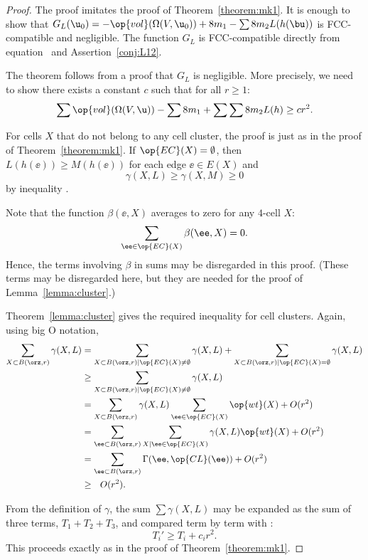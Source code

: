 \begin{proof} The proof imitates the proof of
Theorem~\ref{theorem:mk1}.  It is enough to show that $G_L( \u_0) =
-\op{vol}(\Omega(V, \u_0)) + 8 m_1 - \sum 8 m_2 L(h(\bu))$ is
FCC-compatible and negligible.  The function $G_L$ is FCC-compatible
directly from equation~ and Assertion~\ref{conj:L12}.

The theorem follows from a proof that $G_L$ is negligible.  More
precisely, we need to show there exists a constant $c$ such that
for all $r\ge 1$:%
\begin{equation}\label{eqn:A2neg} 
\sum \op{vol}(\Omega(V, \u)) -\sum 8m_1 + \sum \sum 8 m_2 L(h) \ge c r^2.
\end{equation}

For cells $X$ that do not belong to any cell cluster,
the proof is just as in the proof of Theorem~\ref{theorem:mk1}.
If $\op{EC}(X)=\emptyset$, then 
$L(h(\ee))\ge M(h(\ee))$ for each edge $\ee\in E(X)$ and
\[ \gamma(X,L)\ge \gamma(X,M)\ge 0\]  
by inequality .

Note that the function $\beta(\ee,X)$ averages to zero for any $4$-cell $X$:
\[  
\sum_{\ee\in \op{EC}(X)} \beta(\ee,X) = 0.
\] 
Hence, the terms involving $\beta$ in sums may be disregarded in this proof.
(These terms may be disregarded here, but they are
needed for the proof of Lemma~\ref{lemma:cluster}.)

Theorem~\ref{lemma:cluster} gives the required inequality for cell
clusters.  Again, using big O notation,
\begin{align*} 
\sum_{X\subset B(\orz,r)} \gamma(X,L) &=
\sum_{X\subset B(\orz,r)\mid \op{EC}(X)\ne\emptyset} \gamma(X,L) +
\sum_{X\subset B(\orz,r)\mid \op{EC}(X)=\emptyset} \gamma(X,L) \vspace{6pt}\\
&\ge \sum_{X\subset B(\orz,r)\mid \op{EC}(X)\ne\emptyset} \gamma(X,L)\vspace{6pt} \\
&=\sum_{X\subset B(\orz,r)}\gamma(X,L)\sum_{\ee \in \op{EC}(X)}\op{wt}(X) + O(r^2)\vspace{6pt}\\
&=\sum_{\ee\subset B(\orz,r)}\sum_{X\mid \ee \in \op{EC}(X)}\gamma(X,L)\op{wt}(X) + O(r^2)\vspace{6pt}\\
&=\sum_{\ee\subset B(\orz,r)}\Gamma(\ee,\op{CL}(\ee)) + O(r^2)\vspace{6pt}\\
&\ge ~~O(r^2).
\end{align*}


From the definition of $\gamma$, the sum $\sum \gamma(X,L)$ may be
expanded as the sum of three terms, $T_1+T_2+T_3$, and compared term
by term with :
\[  
T_i' \ge T_i + c_i r^2.
\] 
This proceeds exactly as in the proof of Theorem~\ref{theorem:mk1}.
\end{proof}

